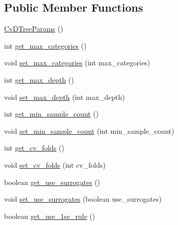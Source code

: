 \subsection*{Public Member Functions}
\begin{DoxyCompactItemize}
\item 
\mbox{\hyperlink{classorg_1_1opencv_1_1ml_1_1_cv_d_tree_params_a0586bbb4381a2af419f472205c98b88e}{Cv\+D\+Tree\+Params}} ()
\item 
int \mbox{\hyperlink{classorg_1_1opencv_1_1ml_1_1_cv_d_tree_params_adc840512101898506c2cfb0ac51811d6}{get\+\_\+max\+\_\+categories}} ()
\item 
void \mbox{\hyperlink{classorg_1_1opencv_1_1ml_1_1_cv_d_tree_params_a697c6f6929582ffc08bf0b766cba0abc}{set\+\_\+max\+\_\+categories}} (int max\+\_\+categories)
\item 
int \mbox{\hyperlink{classorg_1_1opencv_1_1ml_1_1_cv_d_tree_params_ae96a39813334342bee8a5dbef6af0b3e}{get\+\_\+max\+\_\+depth}} ()
\item 
void \mbox{\hyperlink{classorg_1_1opencv_1_1ml_1_1_cv_d_tree_params_aa6f979029a250cb4cf76d38fb8fa85a9}{set\+\_\+max\+\_\+depth}} (int max\+\_\+depth)
\item 
int \mbox{\hyperlink{classorg_1_1opencv_1_1ml_1_1_cv_d_tree_params_a2cc270af7ddcd4f14554d98f0f66098d}{get\+\_\+min\+\_\+sample\+\_\+count}} ()
\item 
void \mbox{\hyperlink{classorg_1_1opencv_1_1ml_1_1_cv_d_tree_params_a114f844951ac9f76bc46810cf318cd20}{set\+\_\+min\+\_\+sample\+\_\+count}} (int min\+\_\+sample\+\_\+count)
\item 
int \mbox{\hyperlink{classorg_1_1opencv_1_1ml_1_1_cv_d_tree_params_abc57db4affd45118d6aba4ec64e72fbe}{get\+\_\+cv\+\_\+folds}} ()
\item 
void \mbox{\hyperlink{classorg_1_1opencv_1_1ml_1_1_cv_d_tree_params_aa79026a3f348254946ee2cf95f3715f8}{set\+\_\+cv\+\_\+folds}} (int cv\+\_\+folds)
\item 
boolean \mbox{\hyperlink{classorg_1_1opencv_1_1ml_1_1_cv_d_tree_params_adba7a5a2000c0e348d8ebf389de381f0}{get\+\_\+use\+\_\+surrogates}} ()
\item 
void \mbox{\hyperlink{classorg_1_1opencv_1_1ml_1_1_cv_d_tree_params_ab0481ad072f88e4cadef9d68242c5aa9}{set\+\_\+use\+\_\+surrogates}} (boolean use\+\_\+surrogates)
\item 
boolean \mbox{\hyperlink{classorg_1_1opencv_1_1ml_1_1_cv_d_tree_params_a59431a1477179acb53c57545fb1a7d7f}{get\+\_\+use\+\_\+1se\+\_\+rule}} ()
\item 

\end{DoxyCompactItemize}
